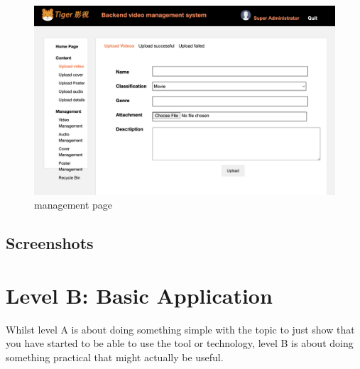 \documentclass[a4paper, 11pt]{report}
\begin{document}
\begin{figure}
\includegraphics[width=1\linewidth]{mng.png}
\caption{\label{mng.png}management page}
\end{figure}
\subsection{Screenshots}




\newpage
\section{Level B: Basic Application}

Whilst level A is about doing something simple with the topic to just show that you have started to be able to use the tool or technology, level B is about doing something practical that might actually be useful.
\end{document}

